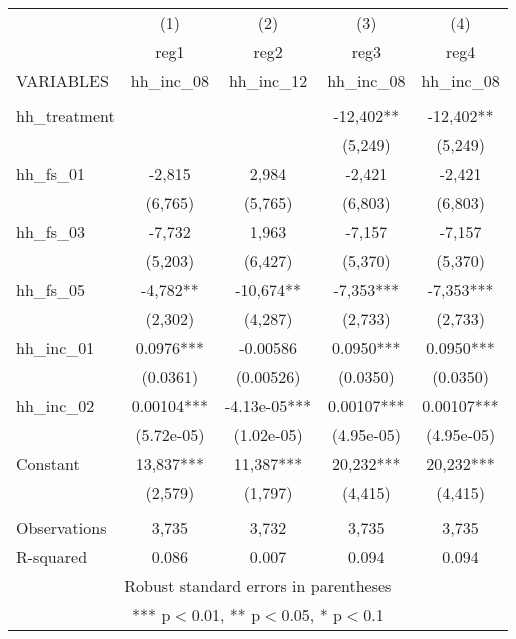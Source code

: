 \documentclass[]{article}
\begin{document}
\begin{tabular}{lcccc} \hline
 & (1) & (2) & (3) & (4) \\
 & reg1 & reg2 & reg3 & reg4 \\
VARIABLES & hh\_inc\_08 & hh\_inc\_12 & hh\_inc\_08 & hh\_inc\_08 \\ \hline
 &  &  &  &  \\
hh\_treatment &  &  & -12,402** & -12,402** \\
 &  &  & (5,249) & (5,249) \\
hh\_fs\_01 & -2,815 & 2,984 & -2,421 & -2,421 \\
 & (6,765) & (5,765) & (6,803) & (6,803) \\
hh\_fs\_03 & -7,732 & 1,963 & -7,157 & -7,157 \\
 & (5,203) & (6,427) & (5,370) & (5,370) \\
hh\_fs\_05 & -4,782** & -10,674** & -7,353*** & -7,353*** \\
 & (2,302) & (4,287) & (2,733) & (2,733) \\
hh\_inc\_01 & 0.0976*** & -0.00586 & 0.0950*** & 0.0950*** \\
 & (0.0361) & (0.00526) & (0.0350) & (0.0350) \\
hh\_inc\_02 & 0.00104*** & -4.13e-05*** & 0.00107*** & 0.00107*** \\
 & (5.72e-05) & (1.02e-05) & (4.95e-05) & (4.95e-05) \\
Constant & 13,837*** & 11,387*** & 20,232*** & 20,232*** \\
 & (2,579) & (1,797) & (4,415) & (4,415) \\
 &  &  &  &  \\
Observations & 3,735 & 3,732 & 3,735 & 3,735 \\
 R-squared & 0.086 & 0.007 & 0.094 & 0.094 \\ \hline
\multicolumn{5}{c}{ Robust standard errors in parentheses} \\
\multicolumn{5}{c}{ *** p$<$0.01, ** p$<$0.05, * p$<$0.1} \\
\end{tabular}
\end{document}
